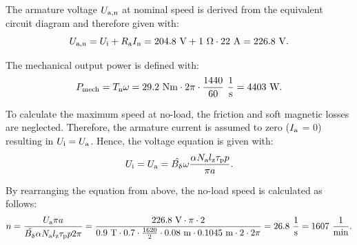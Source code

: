 \begin{solutionblock}
    The armature voltage $\Uan$ at nominal speed is derived from the equivalent circuit diagram and therefore given with:
    \begin{equation}
        \Uan = \Ui + \Ra \In
        = 204.8 \ \si{V} + 1 \ \si{\Omega} \cdot 22 \ \si{A}
        = 226.8 \ \si{V}.
    \end{equation}

    The mechanical output power is defined with:
    \begin{equation}
        P_{\mathrm{mech}} = \Tn \omega
        = 29.2 \ \si{Nm} \cdot 2\pi \cdot \frac{1440}{60} \ \si{\frac{1}{s}}
        = 4403 \ \si{W}.
    \end{equation}

    To calculate the maximum speed at no-load, the friction and soft magnetic losses are neglected. Therefore, the armature current is assumed to zero ($\Ia$ = 0) resulting in $U_{\mathrm{i}} = \Ua$.
    Hence, the voltage equation is given with:
    \begin{equation}
        \Ui = \Ua = \hat{B_{\updelta}} \omega \frac{\alpha N_{\mathrm{a}} \lz \taup p}{\pi a}.
    \end{equation}

    By rearranging the equation from above, the no-load speed is calculated as follows:
    \begin{equation}
        n = \frac{\Ua \pi a}{\hat{B_{\updelta}} \alpha N_{\mathrm{a}} \lz \taup p 2\pi}
        = \frac{226.8 \ \si{V} \cdot \pi \cdot 2}{0.9 \ \si{T} \cdot 0.7 \cdot \frac{1620}{2} \cdot 0.08 \ \si{m} \cdot 0.1045 \ \si{m} \cdot 2 \cdot 2\pi}
        = 26.8 \ \si{\frac{1}{s}} = 1607 \ \si{\frac{1}{min}}.
    \end{equation}

\end{solutionblock}




